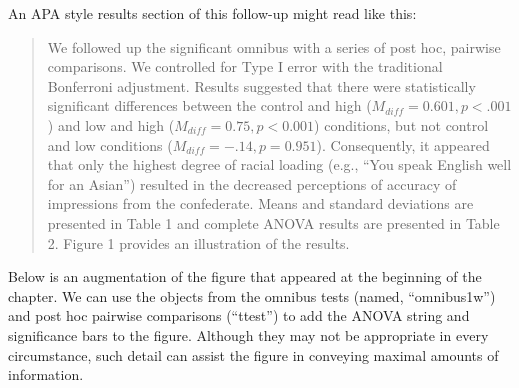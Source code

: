 \documentclass[
  11pt,
]{book}
\begin{document}
An APA style results section of this follow-up might read like this:

\begin{quote}
We followed up the significant omnibus with a series of post hoc, pairwise comparisons. We controlled for Type I error with the traditional Bonferroni adjustment. Results suggested that there were statistically significant differences between the control and high (\(M_{diff} = 0.601, p < .001\)) and low and high (\(M_{diff} = 0.75, p < 0.001\)) conditions, but not control and low conditions (\(M_{diff} = -.14, p = 0.951\)). Consequently, it appeared that only the highest degree of racial loading (e.g., ``You speak English well for an Asian'') resulted in the decreased perceptions of accuracy of impressions from the confederate. Means and standard deviations are presented in Table 1 and complete ANOVA results are presented in Table 2. Figure 1 provides an illustration of the results.
\end{quote}

Below is an augmentation of the figure that appeared at the beginning of the chapter. We can use the objects from the omnibus tests (named, ``omnibus1w'') and post hoc pairwise comparisons (``ttest'') to add the ANOVA string and significance bars to the figure. Although they may not be appropriate in every circumstance, such detail can assist the figure in conveying maximal amounts of information.
\end{document}
